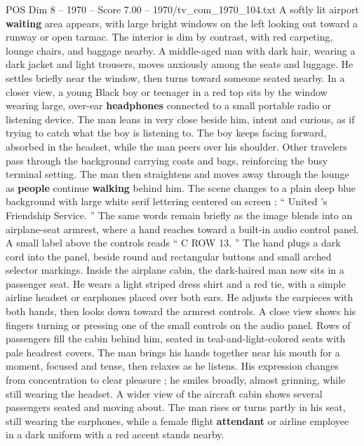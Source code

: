 \begin{textsample}{POS Dim 8 – 1970 – Score 7.00 – 1970/tv\_com\_1970\_104.txt}  \label{ex:f8_pos_033}
A softly lit airport \textbf{waiting} area appears, with large bright windows on the left looking out toward a runway or open tarmac.
The interior is dim by contrast, with red carpeting, lounge chairs, and baggage nearby.
A middle-aged man with dark hair, wearing a dark jacket and light trousers, moves anxiously among the seats and luggage.
He settles briefly near the window, then turns toward someone seated nearby.
In a closer view, a young Black boy or teenager in a red top sits by the window wearing large, over-ear \textbf{headphones} connected to a small portable radio or listening device.
The man leans in very close beside him, intent and curious, as if trying to catch what the boy is listening to.
The boy keeps facing forward, absorbed in the headset, while the man peers over his shoulder.
Other travelers pass through the background carrying coats and bags, reinforcing the busy terminal setting.
The man then straightens and moves away through the lounge as \textbf{people} continue \textbf{walking} behind him.
The scene changes to a plain deep blue background with large white serif lettering centered on screen : “ United ’s Friendship Service. ” The same words remain briefly as the image blends into an airplane-seat armrest, where a hand reaches toward a built-in audio control panel.
A small label above the controls reads “ C ROW 13. ” The hand plugs a dark cord into the panel, beside round and rectangular buttons and small arched selector markings.
Inside the airplane cabin, the dark-haired man now sits in a passenger seat.
He wears a light striped dress shirt and a red tie, with a simple airline headset or earphones placed over both ears.
He adjusts the earpieces with both hands, then looks down toward the armrest controls.
A close view shows his fingers turning or pressing one of the small controls on the audio panel.
Rows of passengers fill the cabin behind him, seated in teal-and-light-colored seats with pale headrest covers.
The man brings his hands together near his mouth for a moment, focused and tense, then relaxes as he listens.
His expression changes from concentration to clear pleasure ; he smiles broadly, almost grinning, while still wearing the headset.
A wider view of the aircraft cabin shows several passengers seated and moving about.
The man rises or turns partly in his seat, still wearing the earphones, while a female flight \textbf{attendant} or airline employee in a dark uniform with a red accent stands nearby.

\end{textsample}
